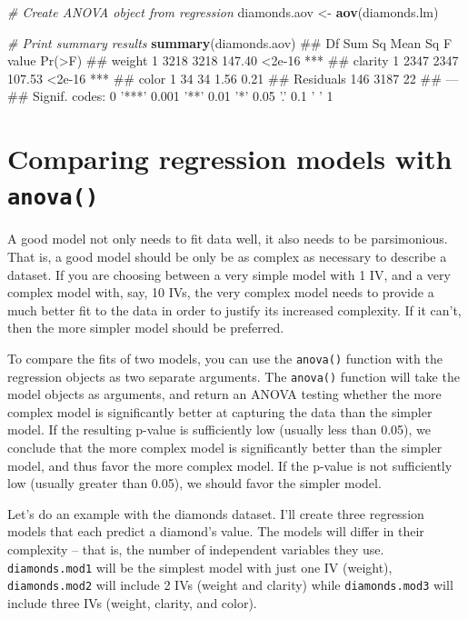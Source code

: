 \documentclass[]{book}
\newenvironment{Shaded}{\begin{snugshade}}{\end{snugshade}}
\newcommand{\KeywordTok}[1]{\textcolor[rgb]{0.13,0.29,0.53}{\textbf{#1}}}
\newcommand{\StringTok}[1]{\textcolor[rgb]{0.31,0.60,0.02}{#1}}
\newcommand{\CommentTok}[1]{\textcolor[rgb]{0.56,0.35,0.01}{\textit{#1}}}
\newcommand{\NormalTok}[1]{#1}
\theoremstyle{definition}
\theoremstyle{definition}
\theoremstyle{remark}
\begin{document}
\begin{Shaded}
\begin{Highlighting}[]
\CommentTok{# Create ANOVA object from regression}
\NormalTok{diamonds.aov <-}\StringTok{ }\KeywordTok{aov}\NormalTok{(diamonds.lm)}

\CommentTok{# Print summary results}
\KeywordTok{summary}\NormalTok{(diamonds.aov)}
\NormalTok{##              Df Sum Sq Mean Sq F value Pr(>F)    }
\NormalTok{## weight        1   3218    3218  147.40 <2e-16 ***}
\NormalTok{## clarity       1   2347    2347  107.53 <2e-16 ***}
\NormalTok{## color         1     34      34    1.56   0.21    }
\NormalTok{## Residuals   146   3187      22                   }
\NormalTok{## ---}
\NormalTok{## Signif. codes:  0 '***' 0.001 '**' 0.01 '*' 0.05 '.' 0.1 ' ' 1}
\end{Highlighting}
\end{Shaded}

\section{\texorpdfstring{Comparing regression models with
\texttt{anova()}}{Comparing regression models with anova()}}\label{comparing-regression-models-with-anova}

A good model not only needs to fit data well, it also needs to be
parsimonious. That is, a good model should be only be as complex as
necessary to describe a dataset. If you are choosing between a very
simple model with 1 IV, and a very complex model with, say, 10 IVs, the
very complex model needs to provide a much better fit to the data in
order to justify its increased complexity. If it can't, then the more
simpler model should be preferred.

To compare the fits of two models, you can use the \texttt{anova()}
function with the regression objects as two separate arguments. The
\texttt{anova()} function will take the model objects as arguments, and
return an ANOVA testing whether the more complex model is significantly
better at capturing the data than the simpler model. If the resulting
p-value is sufficiently low (usually less than 0.05), we conclude that
the more complex model is significantly better than the simpler model,
and thus favor the more complex model. If the p-value is not
sufficiently low (usually greater than 0.05), we should favor the
simpler model.

Let's do an example with the diamonds dataset. I'll create three
regression models that each predict a diamond's value. The models will
differ in their complexity -- that is, the number of independent
variables they use. \texttt{diamonds.mod1} will be the simplest model
with just one IV (weight), \texttt{diamonds.mod2} will include 2 IVs
(weight and clarity) while \texttt{diamonds.mod3} will include three IVs
(weight, clarity, and color).
\end{document}
